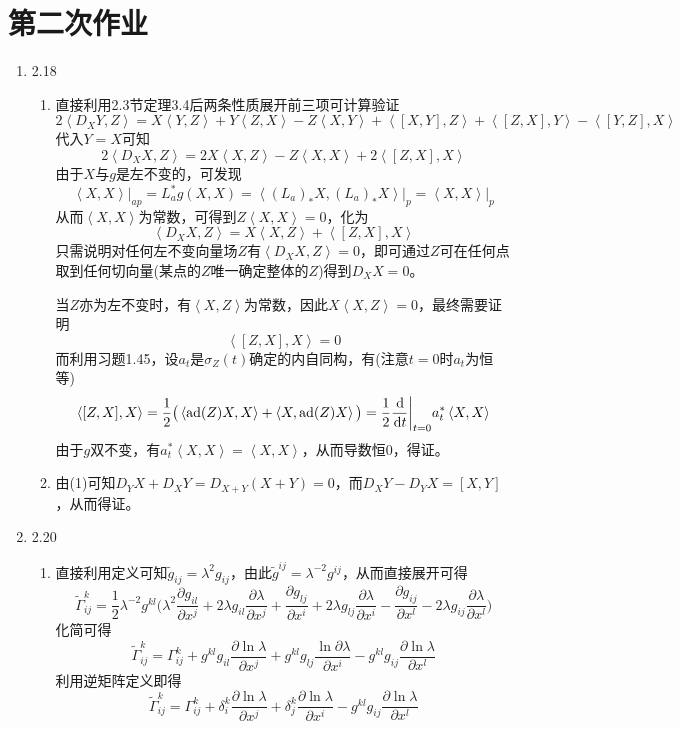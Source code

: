 \documentclass[a4paper,UTF8,fontset=windows,10pt]{ctexart}
\newcommand*{\dr}{\hspace{0.07em}\mathrm{d}}
\begin{document}
\section{第二次作业}
\begin{enumerate}
    \item 2.18
    \begin{enumerate}[(1)]
        \item 直接利用2.3节定理3.4后两条性质展开前三项可计算验证
        $$2\left<D_XY,Z\right>=X\left<Y,Z\right>+Y\left<Z,X\right>-Z\left<X,Y\right>+\left<[X,Y],Z\right>+\left<[Z,X],Y\right>-\left<[Y,Z],X\right>$$
        代入$Y=X$可知
        $$2\left<D_XX,Z\right>=2X\left<X,Z\right>-Z\left<X,X\right>+2\left<[Z,X],X\right>$$
        由于$X$与$g$是左不变的，可发现
        $$\left<X,X\right>\big|_{ap}=L_a^*g(X,X)=\left<(L_a)_*X,(L_a)_*X\right>\big|_p=\left<X,X\right>\big|_p$$
        从而$\left<X,X\right>$为常数，可得到$Z\left<X,X\right>=0$，化为
        $$\left<D_XX,Z\right>=X\left<X,Z\right>+\left<[Z,X],X\right>$$
        只需说明对任何左不变向量场$Z$有$\left<D_XX,Z\right>=0$，即可通过$Z$可在任何点取到任何切向量(某点的$Z$唯一确定整体的$Z$)得到$D_XX=0$。
    
        当$Z$亦为左不变时，有$\left<X,Z\right>$为常数，因此$X\left<X,Z\right>=0$，最终需要证明
        $$\left<[Z,X],X\right>=0$$
        而利用习题1.45，设$a_t$是$\sigma_Z(t)$确定的内自同构，有(注意$t=0$时$a_t$为恒等)
        $$\left<[Z,X],X\right>=\frac{1}{2}\big(\left<\mathrm{ad}(Z)X,X\right>+\left<X,\mathrm{ad}(Z)X\right>\big)=\frac{1}{2}\frac{\dr}{\dr t}\bigg|_{t=0}a_t^*\left<X,X\right>$$
        由于$g$双不变，有$a_t^*\left<X,X\right>=\left<X,X\right>$，从而导数恒0，得证。
    
        \item 由(1)可知$D_YX+D_XY=D_{X+Y}(X+Y)=0$，而$D_XY-D_YX=[X,Y]$，从而得证。
    \end{enumerate}
    
    \item 2.20
    \begin{enumerate}[(1)]
        \item 直接利用定义可知$\tilde{g}_{ij}=\lambda^2g_{ij}$，由此$\tilde{g}^{ij}=\lambda^{-2}g^{ij}$，从而直接展开可得
        $$\tilde{\Gamma}_{ij}^k=\frac{1}{2}\lambda^{-2}g^{kl}\bigg(\lambda^2\frac{\partial g_{il}}{\partial x^j}+2\lambda g_{il}\frac{\partial\lambda}{\partial x^j}+\frac{\partial g_{lj}}{\partial x^i}+2\lambda g_{lj}\frac{\partial\lambda}{\partial x^i}-\frac{\partial g_{ij}}{\partial x^l}-2\lambda g_{ij}\frac{\partial\lambda}{\partial x^l}\bigg)$$
        化简可得
        $$\tilde{\Gamma}_{ij}^k=\Gamma_{ij}^k+g^{kl}g_{il}\frac{\partial\ln\lambda}{\partial x^j}+g^{kl}g_{lj}\frac{\ln\partial\lambda}{\partial x^i}-g^{kl}g_{ij}\frac{\partial\ln\lambda}{\partial x^l}$$
        利用逆矩阵定义即得
        $$\tilde{\Gamma}_{ij}^k=\Gamma_{ij}^k+\delta_i^k\frac{\partial\ln\lambda}{\partial x^j}+\delta_j^k\frac{\partial\ln\lambda}{\partial x^i}-g^{kl}g_{ij}\frac{\partial\ln\lambda}{\partial x^l}$$
    

\end{enumerate}
\end{enumerate}
\end{document}
